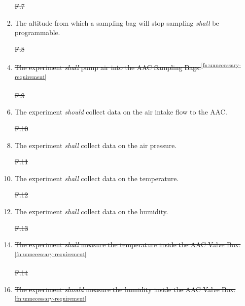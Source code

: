 \documentclass[a4paper,12pt,twoside, final]{article}
\providecommand{\DIFdeltex}[1]{{\protect\color{red}\sout{#1}}}                      %
\providecommand{\DIFaddbegin}{} %
\providecommand{\DIFaddend}{} %
\providecommand{\DIFdelbegin}{} %
\providecommand{\DIFdelend}{} %
\providecommand{\DIFdel}[1]{\texorpdfstring{\DIFdeltex{#1}}{}} %
\newcommand{\DIFscaledelfig}{0.5}
\newlength{\DIFdelgraphicswidth} %
\newlength{\DIFdelgraphicsheight} %
\newcommand{\DIFaddincludegraphics}[2][]{{\color{blue}\fbox{\DIFOincludegraphics[#1]{#2}}}} %
\newcommand{\DIFdelincludegraphics}[2][]{%
\sbox{\DIFdelgraphicsbox}{\DIFOincludegraphics[#1]{#2}}%
\settoboxwidth{\DIFdelgraphicswidth}{\DIFdelgraphicsbox} %
\settoboxtotalheight{\DIFdelgraphicsheight}{\DIFdelgraphicsbox} %
\scalebox{\DIFscaledelfig}{%
\parbox[b]{\DIFdelgraphicswidth}{\usebox{\DIFdelgraphicsbox}\\[-\baselineskip] \rule{\DIFdelgraphicswidth}{0em}}\llap{\resizebox{\DIFdelgraphicswidth}{\DIFdelgraphicsheight}{%
\setlength{\unitlength}{\DIFdelgraphicswidth}%
\begin{picture}(1,1)%
\thicklines\linethickness{2pt} %
{\color[rgb]{1,0,0}\put(0,0){\framebox(1,1){}}}%
{\color[rgb]{1,0,0}\put(0,0){\line( 1,1){1}}}%
{\color[rgb]{1,0,0}\put(0,1){\line(1,-1){1}}}%
\end{picture}%
}\hspace*{3pt}}} %
} %
\DeclareRobustCommand{\DIFaddbegin}{\DIFOaddbegin \let\includegraphics\DIFaddincludegraphics} %
\DeclareRobustCommand{\DIFaddend}{\DIFOaddend \let\includegraphics\DIFOincludegraphics} %
\DeclareRobustCommand{\DIFdelbegin}{\DIFOdelbegin \let\includegraphics\DIFdelincludegraphics} %
\DeclareRobustCommand{\DIFdelend}{\DIFOaddend \let\includegraphics\DIFOincludegraphics} %
\begin{document}
\begin{enumerate}[label=F.\arabic*]
    \DIFdelbegin %
\item[\DIFdel{F.7}]%
\DIFdelend \DIFaddbegin \item \DIFaddend The altitude from which a sampling bag will stop sampling \textit{shall} be programmable.
    \DIFdelbegin %
\item[\DIFdel{F.8}]%
\DIFdelend \DIFaddbegin \item \DIFaddend \st{The experiment \textit{shall} pump air into the AAC Sampling Bags.}\textsuperscript{\ref{fn:unnecessary-requirement}}
    \DIFdelbegin %
\item[\DIFdel{F.9}]%
\DIFdelend \DIFaddbegin \item \DIFaddend The experiment \textit{should} collect data on the air intake flow to the AAC.
    \DIFdelbegin %
\item[\DIFdel{F.10}]%
\DIFdelend \DIFaddbegin \item \DIFaddend The experiment \textit{shall} collect data on the air pressure.
    \DIFdelbegin %
\item[\DIFdel{F.11}]%
\DIFdelend \DIFaddbegin \item \DIFaddend The experiment \textit{shall} collect data on the temperature.
    \DIFdelbegin %
\item[\DIFdel{F.12}]%
\DIFdelend \DIFaddbegin \item \DIFaddend The experiment \textit{shall} collect data on the humidity.
    \DIFdelbegin %
\item[\DIFdel{F.13}]%
\DIFdelend \DIFaddbegin \item \DIFaddend \st{The experiment \textit{shall} measure the temperature inside the AAC Valve Box.}\textsuperscript{\ref{fn:unnecessary-requirement}}
    \DIFdelbegin %
\item[\DIFdel{F.14}]%
\DIFdelend \DIFaddbegin \item \DIFaddend \st{The experiment \textit{should} measure the humidity inside the AAC Valve Box.}\textsuperscript{\ref{fn:unnecessary-requirement}}

\end{enumerate}
\end{document}
